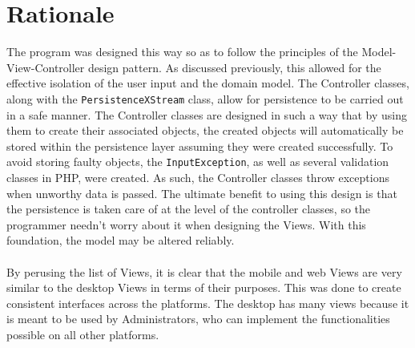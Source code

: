 \documentclass[12pt]{report}
\begin{document}
\section{Rationale}
The program was designed this way so as to follow the principles of the Model-View-Controller design
pattern. As discussed previously, this allowed for the effective isolation of the user input and the
domain model. The Controller classes, along with the \texttt{PersistenceXStream} class, allow for
persistence to be carried out in a safe manner. The Controller classes are designed in such a way
that by using them to create their associated objects, the created objects will automatically be
stored within the persistence layer assuming they were created successfully. To avoid storing faulty
objects, the \texttt{InputException}, as well as several validation classes in PHP, were created. As
such, the Controller classes throw exceptions when unworthy data is passed. The ultimate benefit to
using this design is that the persistence is taken care of at the level of the controller classes,
so the programmer needn't worry about it when designing the Views. With this foundation, the model
may be altered reliably.\\\\
By perusing the list of Views, it is clear that the mobile and web Views are very similar to the
desktop Views in terms of their purposes. This was done to create consistent interfaces across the
platforms. The desktop has many views because it is meant to be used by Administrators, who can
implement the functionalities possible on all other platforms.

\end{document}
